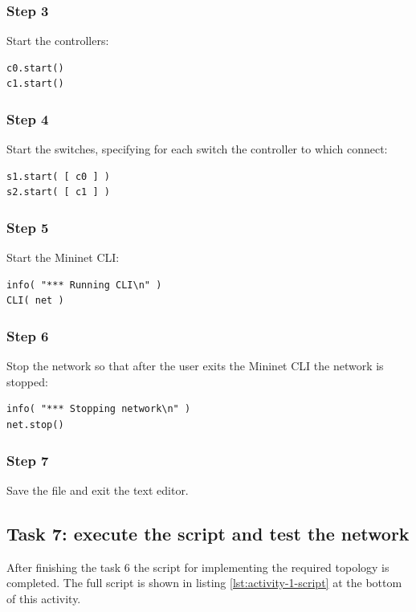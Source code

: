 \subsubsection*{Step 3}
Start the controllers:
\begin{lstlisting}
c0.start()
c1.start()
\end{lstlisting}

\subsubsection*{Step 4}
Start the switches, specifying for each switch the controller to which connect:
\begin{lstlisting}
s1.start( [ c0 ] )
s2.start( [ c1 ] )
\end{lstlisting}

\subsubsection*{Step 5}
Start the Mininet CLI:
\begin{lstlisting}
info( "*** Running CLI\n" )
CLI( net )
\end{lstlisting}

\subsubsection*{Step 6}
Stop the network so that after the user exits the Mininet CLI the network is
stopped:
\begin{lstlisting}
info( "*** Stopping network\n" )
net.stop()
\end{lstlisting}

\subsubsection*{Step 7}
Save the file and exit the text editor.




\subsection*{Task 7: execute the script and test the network}
After finishing the task 6 the script for implementing the required topology is
completed. The full script is shown in listing \ref{lst:activity-1-script} at the
bottom of this activity.

